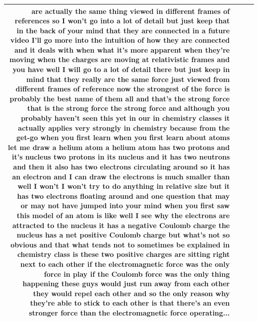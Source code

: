 \documentclass[10pt]{article}
\begin{document}
\begin{tiny}
\begin{longtable}{|r|p{0.375in}|p{1.275in}|p{3.5in}|}
are actually the same thing viewed in different frames of references so I won't go into a lot of detail but just keep that in the back of your mind that they are connected in a future video I'll go more into the intuition of how they are connected and it deals with when what it's more apparent when they're moving when the charges are moving at relativistic frames and you have well I will go to a lot of detail there but just keep in mind that they really are the same force just viewed from different frames of reference now the strongest of the force is probably the best name of them all and that's the strong force that is the strong force the strong force and although you probably haven't seen this yet in our in chemistry classes it actually applies very strongly in chemistry because from the get-go when you first learn when you first learn about atoms let me draw a helium atom a helium atom has two protons and it's nucleus two protons in its nucleus and it has two neutrons and then it also has two electrons circulating around so it has an electron and I can draw the electrons is much smaller than well I won't I won't try to do anything in relative size but it has two electrons floating around and one question that may or may not have jumped into your mind when you first saw this model of an atom is like well I see why the electrons are attracted to the nucleus it has a negative Coulomb charge the nucleus has a net positive Coulomb charge but what's not so obvious and that what tends not to sometimes be explained in chemistry class is these two positive charges are sitting right next to each other if the electromagnetic force was the only force in play if the Coulomb force was the only thing happening these guys would just run away from each other they would repel each other and so the only reason why they're able to stick to each other is that there's an even stronger force than the electromagnetic force operating... \\\hline

\end{longtable}
\end{tiny}
\end{document}
